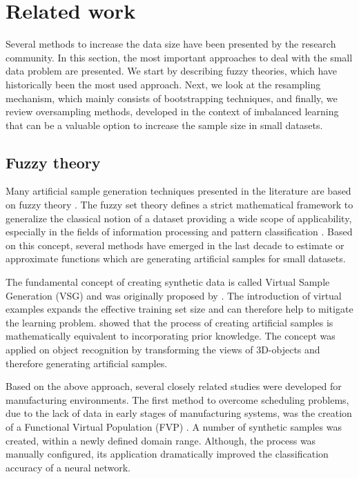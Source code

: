 \documentclass[parskip=full]{scrartcl}
\begin{document}
\section{Related work}
\label{related}

Several methods to increase the data size have been presented by the research community. In this section, the most important approaches to deal with the small data problem are presented. We start by describing fuzzy theories, which have historically been the most used approach. Next, we look at the resampling mechanism, which mainly consists of bootstrapping techniques, and finally, we review oversampling methods, developed in the context of imbalanced learning that can be a valuable option to increase the sample size in small datasets.

\subsection{Fuzzy theory}

Many artificial sample generation techniques presented in the literature are based on fuzzy theory \cite{AbdulLateh.2017}. The fuzzy set theory defines a strict mathematical framework to generalize the classical notion of a dataset providing a wide scope of applicability, especially in the fields of information processing and pattern classification \cite{Zimmermann.2010}. Based on this concept, several methods have emerged in the last decade to estimate or approximate functions which are generating artificial samples for small datasets.

The fundamental concept of creating synthetic data is called Virtual Sample Generation (VSG) and was originally proposed by \cite{Niyogi.1998}. The introduction of virtual examples expands the effective training set size and can therefore help to mitigate the learning problem. \cite{Niyogi.1998} showed that the process of creating artificial samples is mathematically equivalent to incorporating prior knowledge. The concept was applied on object recognition by transforming the views of 3D-objects and therefore generating artificial samples.

Based on the above approach, several closely related studies were developed for manufacturing environments. The first method to overcome scheduling problems, due to the lack of data in early stages of manufacturing systems, was the creation of a Functional Virtual Population (FVP) \cite{Li.2003}. A number of synthetic samples was created, within a newly defined domain range. Although, the process was manually configured, its application dramatically improved the classification accuracy of a neural network. 
\end{document}

